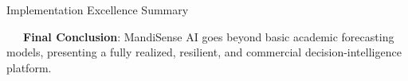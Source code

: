 \documentclass{beamer}
\begin{document}
\begin{frame}{Implementation Excellence Summary}
\vspace{0.15cm}
\begin{tcolorbox}[enhanced, colback=primaryblue!4, colframe=primaryblue!30, boxrule=0.35pt,
  arc=3.5pt, width=0.98\textwidth, left=4pt, right=4pt, top=2.5pt, bottom=2.5pt, boxsep=0pt,
  halign=center, shadow={0.5pt}{-0.5pt}{0pt}{black!8}]
    \fontsize{5.5pt}{6.5pt}\selectfont
    \textcolor{primaryDark}{~~~\textbf{Final Conclusion}: MandiSense AI goes beyond basic academic forecasting models, presenting a fully realized, resilient, and commercial decision-intelligence platform.}
\end{tcolorbox}
\end{frame}

\end{document}
